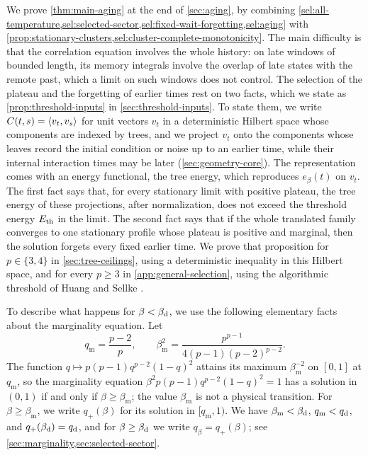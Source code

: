 We prove \cref{thm:main-aging} at the end of \cref{sec:aging}, by combining \cref{sel:all-temperature,sel:selected-sector,sel:fixed-wait-forgetting,sel:aging} with \cref{prop:stationary-clusters,sel:cluster-complete-monotonicity}. The main difficulty is that the correlation equation involves the whole history: on late windows of bounded length, its memory integrals involve the overlap of late states with the remote past, which a limit on such windows does not control. The selection of the plateau and the forgetting of earlier times rest on two facts, which we state as \cref{prop:threshold-inputs} in \cref{sec:threshold-inputs}. To state them, we write $C(t,s)=\left\langle v_t,v_s\right\rangle$ for unit vectors $v_t$ in a deterministic Hilbert space whose components are indexed by trees, and we project $v_t$ onto the components whose leaves record the initial condition or noise up to an earlier time, while their internal interaction times may be later (\cref{sec:geometry-core}). The representation comes with an energy functional, the tree energy, which reproduces $e_\beta(t)$ on $v_t$. The first fact says that, for every stationary limit with positive plateau, the tree energy of these projections, after normalization, does not exceed the threshold energy $E_{\mathrm{th}}$ in the limit. The second fact says that if the whole translated family converges to one stationary profile whose plateau is positive and marginal, then the solution forgets every fixed earlier time. We prove that proposition for $p\in\{3,4\}$ in \cref{sec:tree-ceilings}, using a deterministic inequality in this Hilbert space, and for every $p\ge3$ in \cref{app:general-selection}, using the algorithmic threshold of Huang and Sellke \cite[Theorem~1 and Corollary~1.8]{hs2023}.

To describe what happens for $\beta<\beta_{\mathrm d}$, we use the following elementary facts about the marginality equation. Let
\[
 q_{\mathrm m}=\frac{p-2}{p},\qquad
 \beta_{\mathrm m}^2=\frac{p^{p-1}}{4(p-1)(p-2)^{p-2}}.
\]
The function $q\mapsto p(p-1)q^{p-2}(1-q)^2$ attains its maximum $\beta_{\mathrm m}^{-2}$ on $[0,1]$ at $q_{\mathrm m}$, so the marginality equation $\beta^2p(p-1)q^{p-2}(1-q)^2=1$ has a solution in $(0,1)$ if and only if $\beta\ge\beta_{\mathrm m}$; the value $\beta_{\mathrm m}$ is not a physical transition. For $\beta\ge\beta_{\mathrm m}$, we write $q_+(\beta)$ for its solution in $[q_{\mathrm m},1)$. We have $\beta_{\mathrm m}<\beta_{\mathrm d}$, $q_{\mathrm m}<q_{\mathrm d}$, and $q_+(\beta_{\mathrm d})=q_{\mathrm d}$, and for $\beta\ge\beta_{\mathrm d}$ we write $q_\beta=q_+(\beta)$; see \cref{sec:marginality,sec:selected-sector}.

